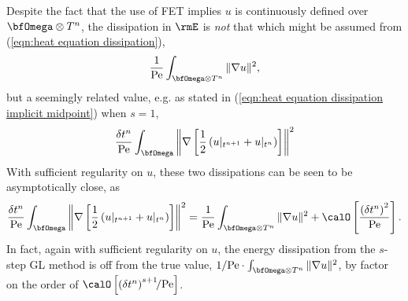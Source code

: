     Despite the fact that the use of FET implies $u$ is continuously defined over $\bfOmega\otimes T^{n}$, the dissipation in $\rmE$ is \emph{not} that which might be assumed from (\ref{eqn:heat equation dissipation}),
    \begin{equation}
        \frac{1}{\rmPe}\int_{\bfOmega\otimes T^{n}}\|\nabla u\|^{2},
    \end{equation}
    but a seemingly related value, e.g. as stated in (\ref{eqn:heat equation dissipation implicit midpoint}) when $s = 1$,
    \begin{equation}
        \frac{\delta t^{n}}{\rmPe}\int_{\bfOmega}\left\|\nabla\left[\frac{1}{2}\left(u|_{t^{n + 1}} + u|_{t^{n}}\right)\right]\right\|^{2}
    \end{equation}
    With sufficient regularity on $u$, these two dissipations can be seen to be asymptotically close, as
    \begin{equation}
      \frac{\delta t^{n}}{\rmPe}\int_{\bfOmega}\left\|\nabla\left[\frac{1}{2}\left(u|_{t^{n + 1}} + u|_{t^{n}}\right)\right]\right\|^{2}  =  \frac{1}{\rmPe}\int_{\bfOmega\otimes T^{n}}\|\nabla u\|^{2} + \calO\left[\frac{\left(\delta t^{n}\right)^{2}}{\rmPe}\right].
    \end{equation}
    In fact, again with sufficient regularity on $u$, the energy dissipation from the $s$-step GL method is off from the true value, $1/\rmPe\cdot\int_{\bfOmega\otimes T^{n}}\|\nabla u\|^{2}$, by factor on the order of $\calO\left[\left(\delta t^{n}\right)^{s + 1}\!\!/\rmPe\right]$.
